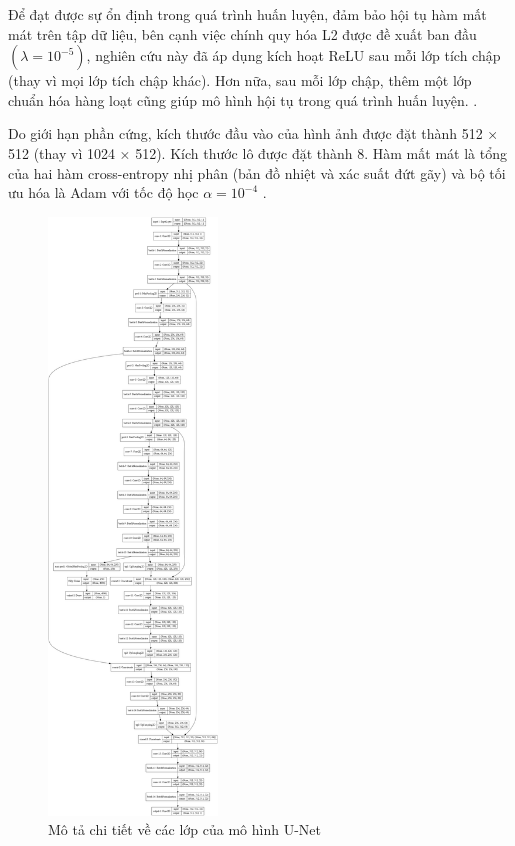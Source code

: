 \documentclass[../the.tex]{subfiles}
\begin{document}
{\fontsize{13}{12} \selectfont

Để đạt được sự ổn định trong quá trình huấn luyện, đảm bảo hội tụ hàm mất mát trên tập dữ liệu, bên cạnh việc chính quy hóa L2 được đề xuất ban đầu $(\lambda = 10^{-5})$, nghiên cứu này đã áp dụng kích hoạt ReLU sau mỗi lớp tích chập (thay vì mọi lớp tích chập khác). Hơn nữa, sau mỗi lớp chập, thêm một lớp chuẩn hóa hàng loạt cũng giúp mô hình hội tụ trong quá trình huấn luyện. \cite{10.5555/3327144.3327174}.

Do giới hạn phần cứng, kích thước đầu vào của hình ảnh được đặt thành 512 × 512 (thay vì 1024 × 512). Kích thước lô được đặt thành 8. Hàm mất mát là tổng của hai hàm cross-entropy nhị phân (bản đồ nhiệt và xác suất đứt gãy) và bộ tối ưu hóa là Adam với tốc độ học $\alpha = 10^{-4}$ \cite{Buja2005LossFF}.


\begin{figure}[H]
\centering
	\includegraphics[width=0.4\textwidth]{images/model_unet.png}
	\caption{Mô tả chi tiết về các lớp của mô hình U-Net}
	\label{fig:model_unet}
\end{figure}

}
\end{document}
